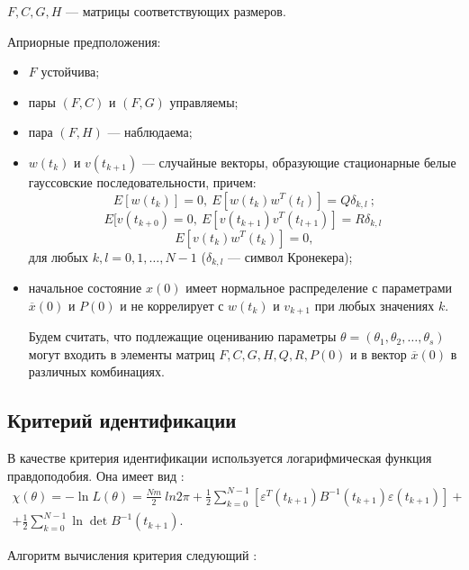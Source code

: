 \documentclass[a4paper,14pt]{extarticle}
\renewcommand{\vec}[1]{#1}
\newcommand{\eps}{\varepsilon}
\begin{document}
$F, C, G, H$ --- матрицы соответствующих размеров.

\bigskip
Априорные предположения:
\begin{itemize}
\item $F$ устойчива;
\item пары $(F, C)$ и $(F, G)$ управляемы;
\item пара $(F, H)$ --- наблюдаема;
\item $\vec{w}(t_k)$ и $\vec{v}(t_{k+1})$ --- случайные векторы, образующие
стационарные белые гауссовские последовательности, причем:
\[
E[\vec{w}(t_k)] = 0,\ E[\vec{w}(t_k)\vec{w}^{T}(t_l)] = Q \delta_{k,l}\ ;
\]
\[
E[\vec{v}(t_{k+0}) = 0,\ E[\vec{v}(t_{k+1})\vec{v}^{T}(t_{l+1})] = R
\delta_{k,l}\;
\]
\[
E[\vec{v}(t_k)\vec{w}^{T}(t_k)] = 0,
\]
для любых $k, l = 0, 1, \ldots, N-1$ ($\delta_{k,l}$ --- символ Кронекера);

\item начальное состояние $\vec{x}(0)$ имеет нормальное распределение с
параметрами $\overline{\vec{x}}(0)$ и $P(0)$ и не коррелирует с $\vec{w(t_k)}$
и $\vec{v_{k+1}}$ при любых значениях $k$.

Будем считать, что подлежащие оцениванию параметры $\theta = (\theta_1,
\theta_2, \ldots, \theta_s)$ могут входить в элементы матриц $F, C, G, H, Q, R,
P(0)$ и в вектор $\overline{\vec{x}}(0)$ в различных комбинациях.

\end{itemize}

\subsection{Критерий идентификации}


В качестве критерия идентификации используется логарифмическая функция
правдоподобия. Она имеет вид \cite{mono}:
\begin{equation*}
\begin{split}
	\chi(\theta) = -\ln{L(\theta)} = \frac{Nm}{2}\ ln{2\pi} + \frac{1}{2}
	\sum\limits_{k=0}^{N-1} \left[ \eps^T(t_{k+1}) B^{-1}(t_{k+1}) \eps(t_{k+1}) \right]
	+ \\ + \frac{1}{2} \sum\limits_{k=0}^{N-1} \ln \det B^{-1}(t_{k+1}).
\end{split}
\end{equation*}

Алгоритм вычисления критерия следующий \cite{mono}:
\end{document}
